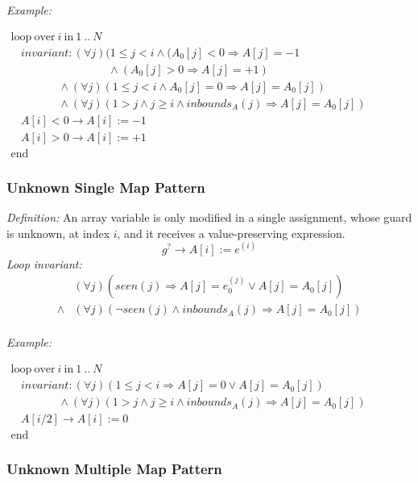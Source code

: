 \documentclass[a4paper,10pt]{article}
\newcommand{\idx}{\ensuremath{i}\xspace}
\newcommand{\at}[1]{{(#1)}}
\newcommand{\KWloop}{\ensuremath{\mathrm{loop}~}}
\newcommand{\KWend}{\ensuremath{\mathrm{end}~}}
\newcommand{\KWover}{\ensuremath{\mathrm{over}~}}
\newcommand{\KWin}{\ensuremath{~\mathrm{in}~}}
\newcommand{\impl}{\ensuremath{\Longrightarrow}}
\newcommand{\inbounds}[2]{\ensuremath{\mathit{inbounds}_{#1}(#2)}\xspace}
\newcommand{\seen}[1]{\ensuremath{\mathit{seen}(#1)}\xspace}
\newcommand{\loopinvariant}{\noindent\textit{Loop invariant:}\xspace}
\newcommand{\patterndef}{\noindent\textit{Definition:}\xspace}
\newcommand{\patternexample}{\noindent\textit{Example:}\xspace}
\begin{document}
\bigskip
\patternexample

\medskip
$\begin{array}{l}
  \KWloop \KWover i \KWin 1~..~N \\
  ~~~~ \textit{invariant}: (\forall j)(1 \leq j < i \land (A_0[j] < 0 \impl A[j] = -1\\
  ~~~~~~~~~~~~~~~~~~~~~~~~~~~~~~~~~~~~~~~ \land (A_0[j] > 0 \impl A[j] = +1)\\
  ~~~~~~~~~~~~~~~~~~~ \land (\forall j)(1 \leq j < i \land A_0[j] = 0 \impl A[j] = A_0[j])\\
  ~~~~~~~~~~~~~~~~~~~ \land (\forall j)(1 > j \land j \geq i \land \inbounds{A}{j} \impl A[j] = A_0[j])\\
  ~~~~ A[i] < 0 \rightarrow A[i] := -1\\
  ~~~~ A[i] > 0 \rightarrow A[i] := +1\\
  \KWend
\end{array}$

\subsubsection*{Unknown Single Map Pattern}

\patterndef An array variable is only modified in a single assignment, whose
guard is unknown, at index \idx, and it receives a value-preserving expression.
%
$$g^? \rightarrow A[\idx] := e^\at{\idx}$$
%
\loopinvariant
%
\begin{eqnarray*}
&(\forall j)(\seen{j} \impl A[j] = e_0^\at{j} \lor A[j] = A_0[j]) \\
\land&
 (\forall j)(\neg \seen{j} \land \inbounds{A}{j} \impl A[j] = A_0[j])\\
\end{eqnarray*}

\bigskip
\patternexample

\medskip
$\begin{array}{l}
  \KWloop \KWover i \KWin 1~..~N \\
  ~~~~ \textit{invariant}: (\forall j)(1 \leq j < i \impl A[j] = 0 \lor A[j]=A_0[j])\\
  ~~~~~~~~~~~~~~~~~~~ \land (\forall j)(1 > j \land j \geq i \land \inbounds{A}{j} \impl A[j] = A_0[j])\\
  ~~~~ A[i/2] \rightarrow A[i] := 0\\
  \KWend
\end{array}$

\subsubsection*{Unknown Multiple Map Pattern}
\end{document}

